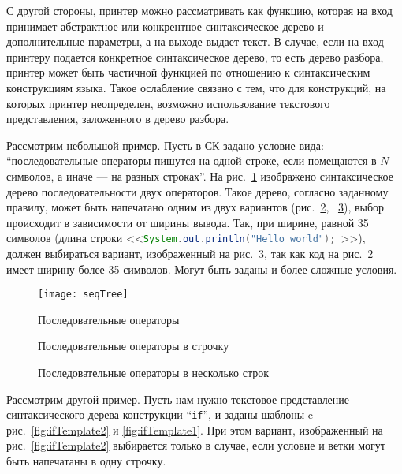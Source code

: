 С другой стороны, принтер можно рассматривать как функцию,
которая на вход принимает
абстрактное или конкрентное синтаксическое дерево и дополнительные параметры,
а на выходе выдает текст. В случае, если на вход принтеру подается конкретное
синтаксическое дерево, то есть дерево разбора, принтер может быть частичной
функцией по отношению к синтаксическим конструкциям языка.
Такое ослабление связано
с тем, что для конструкций, на которых принтер неопределен, возможно использование
текстового представления, заложенного в дерево разбора.

Рассмотрим небольшой пример.
Пусть в СК задано условие вида: “последовательные операторы пишутся
на одной строке,
если помещаются в $N$ символов, а иначе --- на разных строках”.
На рис.~\ref{fig:seqImage} изображено синтаксическое дерево
последовательности двух операторов. Такое дерево, согласно заданному
правилу, может быть напечатано одним из
двух вариантов (рис.~\ref{fig:seqCode1}, ~\ref{fig:seqCode2}),
выбор происходит в зависимости от ширины вывода. Так, при ширине, равной
35 символов (длина строки
<<\lstinline[language = Java]{System.out.println("Hello world"); }>>),
должен выбираться вариант, изображенный на рис.~\ref{fig:seqCode2},
так как код на рис.~\ref{fig:seqCode1} имеет ширину более 35 символов.
Могут быть заданы и более сложные условия.

\begin{figure}[h!]
	\centering
	\texttt{[image: seqTree]}
	\caption{Последовательные операторы}
	\label{fig:seqImage}
\end{figure}

\begin{figure}[h!]
	\centering
	
	\caption{Последовательные операторы в строчку}
	\label{fig:seqCode1}
\end{figure}

\begin{figure}[h!]
	\centering
	
	\caption{Последовательные операторы в несколько строк}
	\label{fig:seqCode2}
\end{figure}


Рассмотрим другой пример.
Пусть нам нужно текстовое представление синтаксического дерева конструкции
“\lstinline{if}”, и заданы шаблоны c рис.~\ref{fig:ifTemplate2} и
\ref{fig:ifTemplate1}. При этом вариант, изображенный на
рис.~\ref{fig:ifTemplate2} выбирается только в случае, если условие и
ветки могут быть напечатаны в одну строчку.

